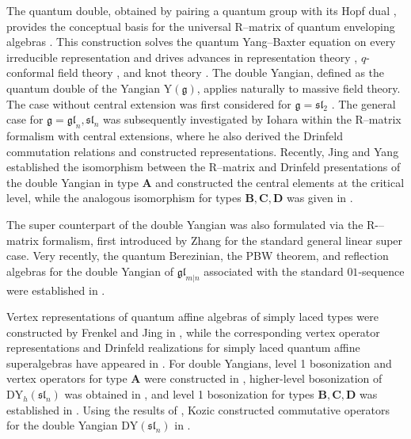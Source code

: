 \documentclass[a4paper,12pt]{article}
\numberwithin{equation}{section}
\begin{document}
The quantum double, obtained by pairing a quantum group with its Hopf dual \cite{D88}, provides the conceptual basis for the universal R--matrix of quantum enveloping algebras \cite{CP94}. This construction solves the quantum Yang--Baxter equation on every irreducible representation and drives advances in representation theory \cite{BFR92, EFM01}, $q$-conformal field theory \cite{EFR96}, and knot theory \cite{R90, RT91}. The double Yangian, defined as the quantum double of the Yangian $\mathrm{Y}(\mathfrak{g})$, applies naturally to massive field theory. The case without central extension was first considered for $\mathfrak{g}=\mathfrak{sl}_{2}$ \cite{K97}. The general case for $\mathfrak{g}=\mathfrak{gl}_{n} , \mathfrak{sl}_{n}$ was subsequently investigated by Iohara \cite{I96} within the R--matrix formalism with central extensions, where he also derived the Drinfeld commutation relations and constructed representations. Recently, Jing and Yang \cite{YJ24} established the isomorphism between the R--matrix and Drinfeld presentations of the double Yangian in type $\boldsymbol{A}$ and constructed the central elements at the critical level, while the analogous isomorphism for types $\boldsymbol{B}, \boldsymbol{C}, \boldsymbol{D}$ was given in \cite{JYL20}. 

The super counterpart of the double Yangian was also formulated via the R-–matrix formalism, first introduced by Zhang \cite{Z97} for the standard general linear super case. Very recently, the quantum Berezinian, the PBW theorem, and reflection algebras for the double Yangian of $\mathfrak{gl}_{m|n}$ associated with the standard $01$-sequence were established in \cite{BK25-1, BK25-2}. 

Vertex representations of quantum affine algebras of simply laced types were constructed by Frenkel and Jing in \cite{FJ88}, while the corresponding vertex operator representations and Drinfeld realizations for simply laced quantum affine superalgebras have  appeared in \cite{XZ}. For double Yangians, level 1 bosonization and vertex operators for type $\boldsymbol{A}$ were constructed in \cite{I96}, higher-level bosonization of $\mathrm{DY}_{h}(\mathfrak{sl}_{n})$ was obtained in \cite{DHHZ98}, and level 1 bosonization for types $\boldsymbol{B},\boldsymbol{C},\boldsymbol{D}$ was established in \cite{JYL20}. Using the results of \cite{I96}, Kozic constructed commutative operators for the double Yangian $\mathrm{DY}(\mathfrak{sl}_{n})$ in \cite{Ko18}.
\end{document}
